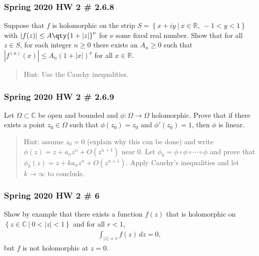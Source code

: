 \hypertarget{spring-2020-hw-2-2.6.8}{%
\subsubsection{Spring 2020 HW 2 \# 2.6.8}\label{spring-2020-hw-2-2.6.8}}

Suppose that \(f\) is holomorphic on the strip
\(S = \left\{{x+iy {~\mathrel{\Big|}~}x\in {\mathbb{R}},~ -1<y<1}\right\}\)
with
\({\left\lvert {f(z)} \right\rvert} \leq A \qty{1 + {\left\lvert {z} \right\rvert}}^\nu\)
for \(\nu\) some fixed real number. Show that for all \(z\in S\), for
each integer \(n\geq 0\) there exists an \(A_n \geq 0\) such that
\({\left\lvert {f^{(n)}(x)} \right\rvert} \leq A_n (1 + {\left\lvert {x} \right\rvert})^\nu\)
for all \(x\in {\mathbb{R}}\).

\begin{quote}
Hint: Use the Cauchy inequalities.
\end{quote}

\hypertarget{spring-2020-hw-2-2.6.9}{%
\subsubsection{Spring 2020 HW 2 \# 2.6.9}\label{spring-2020-hw-2-2.6.9}}

Let \(\Omega \subset {\mathbb{C}}\) be open and bounded and
\(\phi: \Omega \to \Omega\) holomorphic. Prove that if there exists a
point \(z_0 \in \Omega\) such that \(\phi(z_0) = z_0\) and
\(\phi'(z_0) = 1\), then \(\phi\) is linear.

\begin{quote}
Hint: assume \(z_0 = 0\) (explain why this can be done) and write
\(\phi(z) = z + a_n z^n + O(z^{n+1})\) near \(0\). Let
\(\phi_k = \phi \circ \phi \circ \cdots \circ \phi\) and prove that
\(\phi_k(z) = z + ka_nz^n + O(z^{n+1})\). Apply Cauchy's inequalities
and let \(k\to \infty\) to conclude.
\end{quote}

\hypertarget{spring-2020-hw-2-6}{%
\subsubsection{Spring 2020 HW 2 \# 6}\label{spring-2020-hw-2-6}}

Show by example that there exists a function \(f(z)\) that is
holomorphic on
\(\left\{{z\in {\mathbb{C}}{~\mathrel{\Big|}~}0 < {\left\lvert {z} \right\rvert} < 1}\right\}\)
and for all \(r<1\),
\begin{align*}
\int_{{\left\lvert {z} \right\rvert} = r} f(z) \, dz = 0
,\end{align*}
but \(f\) is not holomorphic at \(z=0\).

